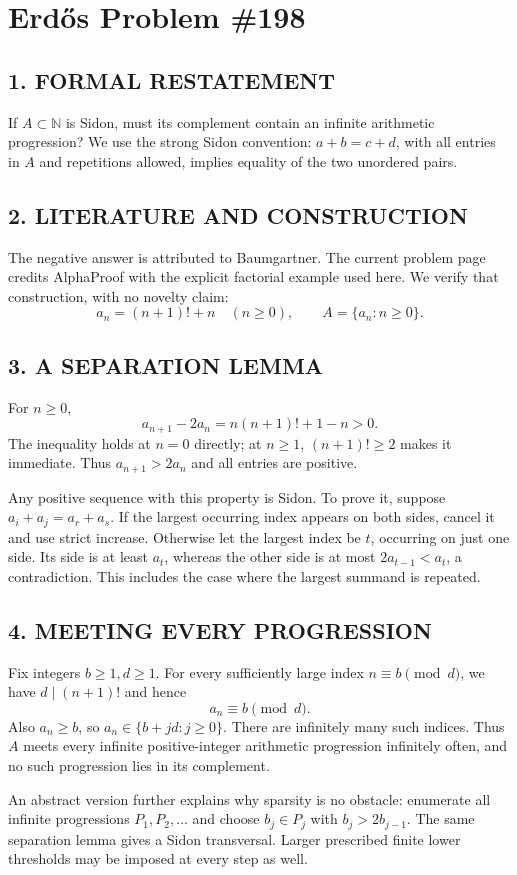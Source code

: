\section{Erd\H{o}s Problem \#198}
\subsection*{1. FORMAL RESTATEMENT}
If $A\subset\mathbb N$ is Sidon, must its complement contain an infinite arithmetic progression? We use the strong Sidon convention: $a+b=c+d$, with all entries in $A$ and repetitions allowed, implies equality of the two unordered pairs.
\subsection*{2. LITERATURE AND CONSTRUCTION}
The negative answer is attributed to Baumgartner. The current problem page credits AlphaProof with the explicit factorial example used here. We verify that construction, with no novelty claim:
\[
 a_n=(n+1)!+n\quad(n\ge0),\qquad A=\{a_n:n\ge0\}.
\]
\subsection*{3. A SEPARATION LEMMA}
For $n\ge0$,
\[
 a_{n+1}-2a_n=n(n+1)!+1-n>0.
\]
The inequality holds at $n=0$ directly; at $n\ge1$, $(n+1)!\ge2$ makes it immediate. Thus $a_{n+1}>2a_n$ and all entries are positive.

Any positive sequence with this property is Sidon. To prove it, suppose $a_i+a_j=a_r+a_s$. If the largest occurring index appears on both sides, cancel it and use strict increase. Otherwise let the largest index be $t$, occurring on just one side. Its side is at least $a_t$, whereas the other side is at most $2a_{t-1}<a_t$, a contradiction. This includes the case where the largest summand is repeated.
\subsection*{4. MEETING EVERY PROGRESSION}
Fix integers $b\ge1,d\ge1$. For every sufficiently large index $n\equiv b\pmod d$, we have $d\mid(n+1)!$ and hence
\[
 a_n\equiv b\pmod d.
\]
Also $a_n\ge b$, so $a_n\in\{b+jd:j\ge0\}$. There are infinitely many such indices. Thus $A$ meets every infinite positive-integer arithmetic progression infinitely often, and no such progression lies in its complement.

An abstract version further explains why sparsity is no obstacle: enumerate all infinite progressions $P_1,P_2,\ldots$ and choose $b_j\in P_j$ with $b_j>2b_{j-1}$. The same separation lemma gives a Sidon transversal. Larger prescribed finite lower thresholds may be imposed at every step as well.
